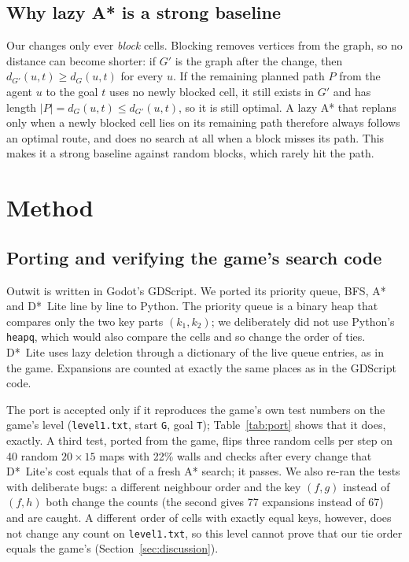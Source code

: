 \documentclass[conference,12pt]{IEEEtran}
\newcommand{\dstar}{D*~Lite}
\begin{document}
\subsection{Why lazy A* is a strong baseline}
Our changes only ever \emph{block} cells. Blocking removes vertices from the graph, so no
distance can become shorter: if $G'$ is the graph after the change, then
$d_{G'}(u,t)\ge d_G(u,t)$ for every $u$. If the remaining planned path $P$ from the agent $u$ to
the goal $t$ uses no newly blocked cell, it still exists in $G'$ and has length
$|P|=d_G(u,t)\le d_{G'}(u,t)$, so it is still optimal. A lazy A* that replans only when a newly
blocked cell lies on its remaining path therefore always follows an optimal route, and does no
search at all when a block misses its path. This makes it a strong baseline against random
blocks, which rarely hit the path.

\section{Method}
\label{sec:method}

\subsection{Porting and verifying the game's search code}
Outwit is written in Godot's GDScript. We ported its priority queue, BFS, A* and \dstar{} line
by line to Python. The priority queue is a binary heap that compares only the two key parts
$(k_1,k_2)$; we deliberately did not use Python's \texttt{heapq}, which would also compare
the cells and so change the order of ties. \dstar{} uses lazy deletion through a dictionary
of the live queue entries, as in the game. Expansions are counted at exactly the same places
as in the GDScript code.

The port is accepted only if it reproduces the game's own test numbers on the game's level
(\texttt{level1.txt}, start \texttt{G}, goal \texttt{T}); Table~\ref{tab:port} shows that it
does, exactly. A third test, ported from the game, flips three random cells per step on 40
random $20\times15$ maps with 22\% walls and checks after every change that \dstar{}'s cost
equals that of a fresh A* search; it passes. We also re-ran the tests with deliberate bugs:
a different neighbour order and the key $(f,g)$ instead of $(f,h)$ both change the counts (the
second gives 77 expansions instead of 67) and are caught. A different order of cells with
exactly equal keys, however, does not change any count on \texttt{level1.txt}, so this level
cannot prove that our tie order equals the game's (Section~\ref{sec:discussion}).
\end{document}
